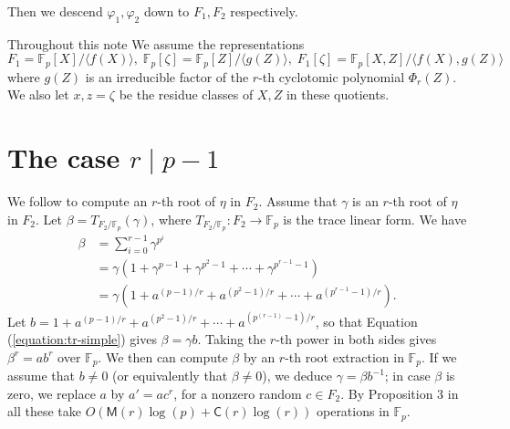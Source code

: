\documentclass[12pt]{article}
\theoremstyle{plain}
\theoremstyle{definition}
\def\F{\mathbb{F}}
\def\M{\mathsf{M}}
\def\CC{\mathsf{C}}
\begin{document}
\begin{description}
	\begin{center}
	\end{center}
	Then we descend $\varphi_1, \varphi_2$ down to $F_1, F_2$ respectively.
\end{description}
Throughout this note We assume the representations
\begin{equation}
\label{equation:rep}
	F_1 = \F_p[X] / \langle f(X) \rangle, \; \F_p[\zeta] = \F_p[Z] / \langle g(Z) \rangle, \;
	F_1[\zeta] = \F_p[X, Z] / \langle f(X), g(Z) \rangle
\end{equation}
where $g(Z)$ is an irreducible factor of the $r$-th cyclotomic polynomial $\Phi_r(Z)$. We also let $x, z = \zeta$ be the residue classes of $X, Z$ in these quotients.



\section{The case $r \mid p - 1$}

We follow \cite{doliskanischost2011} to compute an $r$-th root of $\eta$ in $F_2$. Assume that $\gamma$ is an $r$-th root of $\eta$ in $F_2$. Let $\beta = T_{F_2 / \F_p}(\gamma)$, where $T_{F_2 / \F_p}:F_2 \to \F_p$ is the trace linear form. We have
\begin{align}
\label{equation:tr-simple}
\beta 
& = \sum_{i = 0}^{r - 1} \gamma^{p^i} \nonumber \\
& = \gamma(1 + \gamma^{p - 1} + \gamma^{p^2 - 1} + \cdots + \gamma^{p^{r - 1} - 1}) \nonumber \\
& = \gamma(1 + a^{(p - 1) / r} + a^{(p^2 - 1) / r} + \cdots + a^{(p^{r - 1} - 1) / r}).
\end{align}
Let $b = 1 + a^{(p - 1) / r} + a^{(p^2 - 1) / r} + \cdots + a^{(p^{(r - 1)} - 1) / r}$, so that Equation (\ref{equation:tr-simple}) gives $\beta = \gamma b$. Taking the $r$-th power in both sides gives $\beta^r = ab^r$ over $\F_p$. We then can compute $\beta$ by an $r$-th root extraction in $\F_p$. If we assume that $b \ne 0$ (or equivalently that $\beta \ne 0$), we deduce $\gamma = \beta b^{-1}$; in case $\beta$ is zero, we replace $a$ by $a'=ac^r$, for a nonzero random $c \in F_2$. By Proposition 3 in \cite{doliskanischost2011} all these take $O(\M(r)\log(p) + \CC(r)\log(r))$ operations in $\F_p$.
\end{document}
